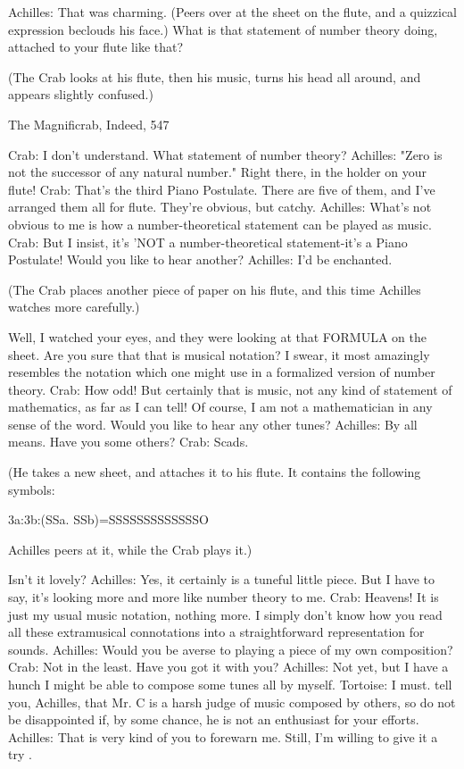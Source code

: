 {Achilles: That was charming. (Peers over at the sheet on the flute, and a quizzical expression
  beclouds his face.) What is that statement of number theory doing, attached to your flute
  like that?

(The Crab looks at his flute, then his music, turns his head all around, and appears slightly
   confused.)




  The Magnificrab, Indeed,                                                                  547

Crab: I don't understand. What statement of number theory?
Achilles: "Zero is not the successor of any natural number." Right there, in the holder on
  your flute!
Crab: That's the third Piano Postulate. There are five of them, and I've arranged them all for
  flute. They're obvious, but catchy.
Achilles: What's not obvious to me is how a number-theoretical statement can be played as
  music.
Crab: But I insist, it's 'NOT a number-theoretical statement-it's a Piano Postulate! Would
  you like to hear another?
Achilles: I'd be enchanted.

(The Crab places another piece of paper on his flute, and this time Achilles watches more
   carefully.)

  Well, I watched your eyes, and they were looking at that FORMULA on the sheet. Are
  you sure that that is musical notation? I swear, it most amazingly resembles the notation
  which one might use in a formalized version of number theory.
Crab: How odd! But certainly that is music, not any kind of statement of mathematics, as
  far as I can tell! Of course, I am not a mathematician in any sense of the word. Would
  you like to hear any other tunes?
Achilles: By all means. Have you some others?
Crab: Scads.

   (He takes a new sheet, and attaches it to his flute. It contains the following symbols:

                            3a:3b:(SSa. SSb)=SSSSSSSSSSSSSO

   Achilles peers at it, while the Crab plays it.)

  Isn't it lovely?
Achilles: Yes, it certainly is a tuneful little piece. But I have to say, it's looking more and
  more like number theory to me.
Crab: Heavens! It is just my usual music notation, nothing more. I simply don't know how
  you read all these extramusical connotations into a straightforward representation for
  sounds.
Achilles: Would you be averse to playing a piece of my own composition?
Crab: Not in the least. Have you got it with you?
Achilles: Not yet, but I have a hunch I might be able to compose some tunes all by myself.
Tortoise: I must. tell you, Achilles, that Mr. C is a harsh judge of music composed by others,
  so do not be disappointed if, by some chance, he is not an enthusiast for your efforts.
Achilles: That is very kind of you to forewarn me. Still, I'm willing to give it a try .

}
